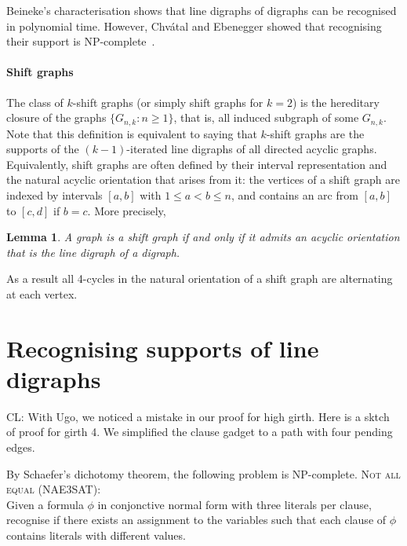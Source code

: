 \documentclass[11pt,a4aper]{article}
\newtheorem{lemma}[theorem]{Lemma}
\newenvironment{csproblem}[1]{\textsc{#1}:\\}{}
\renewcommand{\ge}{\geqslant}
\renewcommand{\le}{\leqslant}
\newcommand{\clement}[1]{{\color{orange} CL: #1}}
\begin{document}
Beineke's characterisation shows that line digraphs of digraphs can be
recognised in polynomial time. However, Chv\'atal and Ebenegger showed that
recognising their support is NP-complete~\cite{chvatal1990Note}.

\paragraph{Shift graphs}
The class of $k$-shift graphs (or simply shift graphs for $k=2$) is the
hereditary closure of the graphs $\{G_{n,k} : n \ge 1\}$, that is, all induced
subgraph of some $G_{n,k}$. Note that this definition is equivalent to saying
that $k$-shift graphs are the supports of the $(k-1)$-iterated line digraphs of
all directed acyclic graphs. Equivalently, shift graphs are often defined by
their interval representation and the natural acyclic orientation that arises
from it: the vertices of a shift graph are indexed by intervals $[a,b]$ with
$1 \le a < b \le n$, and contains an arc from $[a,b]$ to $[c,d]$ if $b = c$. More precisely,
\begin{lemma}\label{lem:valid}
  A graph is a shift graph if and only if it admits an acyclic orientation that
  is the line digraph of a digraph.
\end{lemma}
As a result all 4-cycles in the natural orientation of a shift graph are
alternating at each vertex.

\section{Recognising supports of line digraphs}
\clement{With Ugo, we noticed a mistake in our proof for high girth. Here is a
  sktch of proof for girth 4. We simplified the clause gadget to a path with
  four pending edges.}

By Schaefer's dichotomy theorem, the following problem is NP-complete. 
\begin{csproblem}{Not all equal (NAE3SAT)}
  Given a formula $\phi$ in conjonctive normal form with three literals per
  clause, recognise if there exists an assignment to the variables such that each
  clause of $\phi$ contains literals with different values.    
\end{csproblem}
\end{document}
